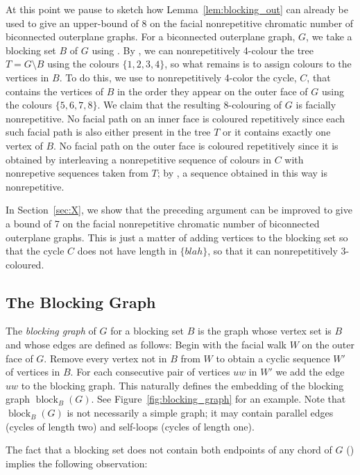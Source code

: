 \documentclass{patmorin}
\DeclareMathOperator{\block}{block}
\begin{document}
At this point we pause to sketch how Lemma~\ref{lem:blocking_out}
can already be used to give an upper-bound of 8 on the facial
nonrepetitive chromatic number of biconnected outerplane graphs.  For a
biconnected outerplane graph, $G$, we take a blocking set $B$ of $G$
using .  By , we can nonrepetitively
4-colour the tree $T=G\setminus B$ using the colours $\{1,2,3,4\}$, so
what remains is to assign colours to the vertices in $B$.  To do this,
we use  to nonrepetitively 4-color the cycle, $C$, that
contains the vertices of $B$ in the order they appear on the outer face
of $G$ using the colours $\{5,6,7,8\}$.  We claim that the resulting
8-colouring of $G$ is facially nonrepetitive.  No facial path on an
inner face is coloured repetitively since each such facial path is also
either present in the tree $T$ or it contains exactly one vertex of $B$.
No facial path on the outer face is coloured repetitively since it is
obtained by interleaving a nonrepetitive sequence of colours in $C$
with nonrepetive sequences taken from $T$; by ,
a sequence obtained in this way is nonrepetitive.

In Section~\ref{sec:X}, we show that the preceding argument can be
improved to give a bound of 7 on the facial nonrepetitive chromatic
number of biconnected outerplane graphs. This is just a matter of adding
vertices to the blocking set so that the cycle $C$ does not have length
in $\{blah\}$, so that it can nonrepetitively 3-coloured. 

\subsection{The Blocking Graph}


The \emph{blocking graph} of $G$ for a blocking set $B$ is the graph
whose vertex set is $B$ and whose edges are defined as follows:  Begin
with the facial walk $W$ on the outer face of $G$. Remove every vertex
 not in $B$ from $W$ to obtain a cyclic sequence $W'$ of vertices in
$B$. For each consecutive pair of vertices $uw$ in $W'$ we add the edge
 $uw$ to the blocking graph.  This naturally defines the embedding of
 the blocking graph $\block_B(G)$. See Figure~\ref{fig:blocking_graph}
 for an example.   Note that $\block_B(G)$ is not necessarily a simple
graph; it may contain parallel edges (cycles of length two) and self-loops
(cycles of length one). 

The fact that a blocking set does not contain both endpoints of any
chord of $G$ () implies the following observation:
\end{document}
